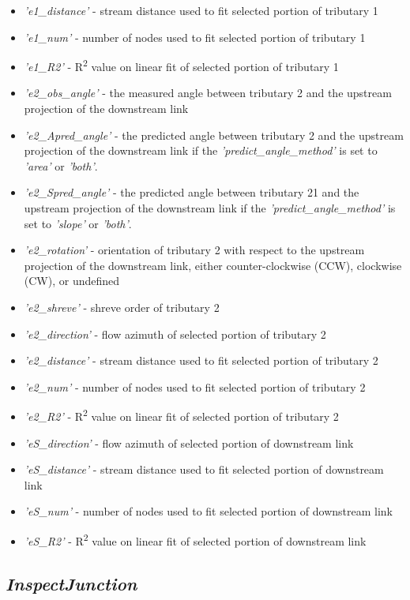 \begin{itemize}
	\item \textit{'e1\_distance'} - stream distance used to fit selected portion of tributary 1
	\item \textit{'e1\_num'} - number of nodes used to fit selected portion of tributary 1
	\item \textit{'e1\_R2'} - R\textsuperscript{2} value on linear fit of selected portion of tributary 1
	\item \textit{'e2\_obs\_angle'} - the measured angle between tributary 2 and the upstream projection of the downstream link
	\item \textit{'e2\_Apred\_angle'} - the predicted angle between tributary 2 and the upstream projection of the downstream link if the \textit{'predict\_angle\_method'} is set to \textit{'area'} or \textit{'both'}.
	\item \textit{'e2\_Spred\_angle'} - the predicted angle between tributary 21 and the upstream projection of the downstream link if the \textit{'predict\_angle\_method'} is set to \textit{'slope'} or \textit{'both'}.
	\item \textit{'e2\_rotation'} - orientation of tributary 2 with respect to the upstream projection of the downstream link, either counter-clockwise (CCW), clockwise (CW), or undefined
	\item \textit{'e2\_shreve'} - shreve order of tributary 2
	\item \textit{'e2\_direction'} - flow azimuth of selected portion of tributary 2
	\item \textit{'e2\_distance'} - stream distance used to fit selected portion of tributary 2
	\item \textit{'e2\_num'} - number of nodes used to fit selected portion of tributary 2
	\item \textit{'e2\_R2'} - R\textsuperscript{2} value on linear fit of selected portion of tributary 2
	\item \textit{'eS\_direction'} - flow azimuth of selected portion of downstream link
	\item \textit{'eS\_distance'} - stream distance used to fit selected portion of downstream link
	\item \textit{'eS\_num'} - number of nodes used to fit selected portion of downstream link
	\item \textit{'eS\_R2'} - R\textsuperscript{2} value on linear fit of selected portion of downstream link
\end{itemize}

\subsection{\textit{InspectJunction}} \label{sec:InJunc}
